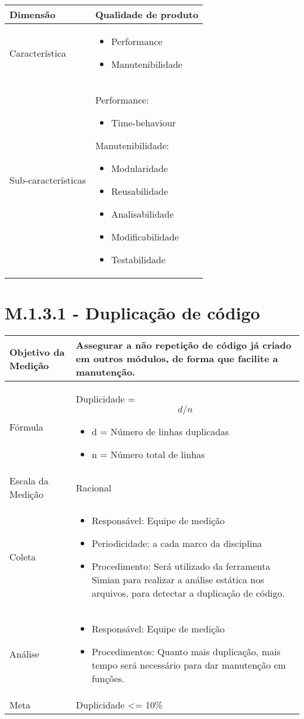 	\begin{tabular}{ |p{4cm}|p{8cm}| }
	\hline
		Dimensão 		& 	Qualidade de produto	 \\
	 \hline
	 Característica 		& 	\begin{itemize} \item Performance \item Manutenibilidade \end{itemize}	 \\
	 \hline
	 Sub-características 		& 	Performance: \begin{itemize}	\item Time-behaviour \end{itemize} Manutenibilidade: \begin{itemize} \item Modularidade \item Reusabilidade \item Analisabilidade \item Modificabilidade \item Testabilidade \end{itemize} \\
	 \hline
	\end{tabular}

\section{M.1.3.1 - Duplicação de código} 

	\begin{tabular}{ |p{4cm}|p{8cm}|  }
	 \hline
	 Objetivo da Medição 		& 	Assegurar a não repetição de código já criado em outros módulos, de forma que facilite a manutenção.   \\
	 \hline
	 Fórmula		& 	Duplicidade = \[d / n\]	\begin{itemize} \item d = Número de linhas duplicadas \item n = Número total de linhas \end{itemize}\\
	 \hline
	 Escala da Medição 		& Racional		 \\
	 \hline
	 Coleta		& 	\begin{itemize} \item Responsável: Equipe de medição \item Periodicidade: a cada marco da disciplina \item Procedimento: Será utilizado da ferramenta Simian para realizar a análise estática nos arquivos, para detectar a duplicação de código.\end{itemize}	\\
	 \hline
	 Análise		& 	\begin{itemize} \item Responsável: Equipe de medição \item Procedimentos: Quanto mais duplicação, mais tempo será necessário para dar manutenção em funções. \end{itemize}	 \\
	 \hline
	 Meta		& 	Duplicidade <= 10\%	 \\
	 \hline
	\end{tabular}

